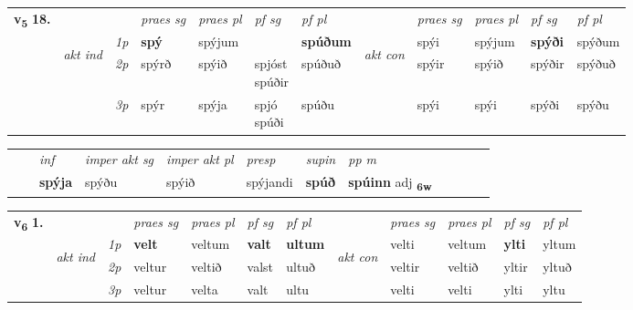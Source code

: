 \begin{tabular}{llllllllllll} \toprule
\multirow{4}{*}{{{\textbf{v{\textsubscript{5}}} \Large{\textbf{18.}}}}}  & &   &  \textit{praes sg}  & \textit{praes pl}  &\textit{ pf sg} & \textit{pf pl} &  &  \textit{praes sg}  & \textit{praes pl}  & \textit{pf sg} & \textit{pf pl } \\*
	\cmidrule{4-7} \cmidrule{9-12}
 & \multirow{3}{*}{\begin{turn}{90}\textit{akt ind}\end{turn}} & {\textit{1p}} & \textbf{spý} & spýjum    & \textbf{\specialcell{spjó\\ spúði}} & \textbf{spúðum} & \multirow{3}{*}{\begin{turn}{90}\textit{akt con}\end{turn}} &spýi & spýjum & \textbf{spýði} & spýðum\\*
& &  {\textit{2p}} &  spýrð  & spýið   & \specialcell{spjóst\\ spúðir} & spúðuð & & spýir & spýið & spýðir & spýðuð \\*
& &  {\textit{3p}} & spýr & spýja   & \specialcell{spjó\\ spúði} & spúðu & & spýi & spýi& spýði & spýðu  \\*
\cmidrule{4-7} \cmidrule{9-12}
\end{tabular}


\begin{tabular}{llllllllllll}
 & & \textit{inf} & \textit{imper akt sg} & \textit{imper akt pl}   & \textit{presp} & \textit{supin}  & \textit{pp m}     \\*
  & & \textbf{spýja} & spýðu  & spýið   & spýjandi &  \textbf{spúð}  & \textbf{spúinn} adj \textbf{\textsubscript{6w}} \\*
\cmidrule{1-12}
\end{tabular}



\begin{tabular}{llllllllllll} \toprule
\multirow{4}{*}{{{\textbf{v{\textsubscript{6}}} \Large{\textbf{1.}}}}}  & &   &  \textit{praes sg}  & \textit{praes pl}  &\textit{ pf sg} & \textit{pf pl} &  &  \textit{praes sg}  & \textit{praes pl}  & \textit{pf sg} & \textit{pf pl } \\*
	\cmidrule{4-7} \cmidrule{9-12}
 & \multirow{3}{*}{\begin{turn}{90}\textit{akt ind}\end{turn}} & {\textit{1p}} & \textbf{velt} & veltum    & \textbf{valt} & \textbf{ultum} & \multirow{3}{*}{\begin{turn}{90}\textit{akt con}\end{turn}} &velti & veltum & \textbf{ylti} & yltum\\*
& &  {\textit{2p}} &  veltur  & veltið   & valst & ultuð & & veltir & veltið & yltir & yltuð \\*
& &  {\textit{3p}} & veltur & velta   & valt & ultu & & velti & velti& ylti & yltu  \\*
\cmidrule{4-7} \cmidrule{9-12}
\end{tabular}


